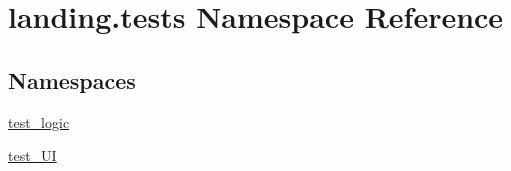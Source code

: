 \hypertarget{namespacelanding_1_1tests}{}\section{landing.\+tests Namespace Reference}
\label{namespacelanding_1_1tests}
\subsection*{Namespaces}
\begin{DoxyCompactItemize}
\item 
 \mbox{\hyperlink{namespacelanding_1_1tests_1_1test__logic}{test\+\_\+logic}}
\item 
 \mbox{\hyperlink{namespacelanding_1_1tests_1_1test__UI}{test\+\_\+\+UI}}
\end{DoxyCompactItemize}
